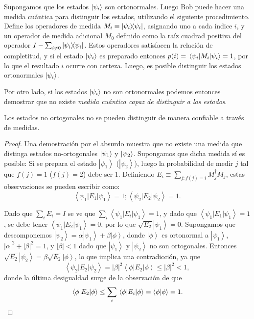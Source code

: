 Supongamos que los estados $\ket{\psi_i}$ son ortonormales. Luego Bob puede hacer una medida cuántica para distinguir los estados, utilizando el siguiente procedimiento. Define
los operadores de medida $M_i \equiv \ketbra{\psi_i}{\psi_i}$, 
asignando uno a cada índice $i$, y un operador de medida adicional $M_0$ definido como la raíz cuadrad positiva del operador $I - \sum_{i \neq 0}
\ketbra{\psi_i}{\psi_i}$. Estos operadores satisfacen la relación de completitud,
y si el estado $\ket{\psi_i}$ es preparado entonces $p(i) = \mel{\psi_i}{M_i}
{\psi_i} = 1$, por lo que el resultado $i$ ocurre con certeza. 
Luego, es posible distinguir los estados ortonormales $\ket{\psi_i}$.

Por otro lado, si los estados $\ket{\psi_i}$ 
no son ortonormales podemos entonces demostrar que no existe  \emph{medida cuántica capaz de distinguir a los estados}.

\begin{theorem}
  Los estados no ortogonales no se pueden distinguir de manera confiable a través de medidas.

\end{theorem}

\begin{proof}
  Una demostración por el absurdo muestra que no existe una medida que distinga estados no-ortogonales $\ket{\psi_1}$ y $\ket{\psi_2}$. Supongamos que dicha medida sí es posible: 
Si se prepara el estado $\left|\psi_1\right\rangle$
($\left|\psi_2\right\rangle$), luego la probabilidad de medir 
  $j$ tal que $f(j) = 1$ ($f(j)
  = 2$) debe ser 1. Definiendo
$E_i \equiv \sum_{j: f(j) = i}M_j^\dagger M_j$, estas observaciones se pueden escribir como:
\begin{equation*}
\left\langle\psi_1 |  E_1 |\psi_1\right\rangle = 1; \left\langle\psi_2 |  E_2 |\psi_2\right\rangle = 1.
\end{equation*}

Dado que $\sum_iE_i = I$ se ve que
$\sum_i\left\langle\psi_1 |  E_i |\psi_1\right\rangle = 1$, y dado que
$\left\langle\psi_1 |  E_1 |\psi_1\right\rangle = 1$, se debe tener
$\left\langle\psi_1 |  E_2 |\psi_1\right\rangle = 0$, por lo que
$\sqrt{E_2}\left|\psi_1\right\rangle = 0$. Supongamos que descomponemos 
$\left|\psi_2\right\rangle = \alpha\left|\psi_1\right\rangle + \beta\left|\phi\right\rangle$,
donde $\left|\phi\right\rangle$ es ortonormal a
$\left|\psi_1\right\rangle$, $|\alpha|^2 + |\beta|^2 = 1$, y
$|\beta| <
  1$ dado que $\left|\psi_1\right\rangle$ y $\left|\psi_2\right\rangle$
no son ortogonales. Entonces
$\sqrt{E_2}\left|\psi_2\right\rangle = \beta\sqrt{E_2}\left|\phi\right\rangle$,
lo que implica una contradicción, ya que
\begin{equation*}\left\langle\psi_2 |  E_2 |\psi_2\right\rangle = |\beta|^2\left\langle\phi |  E_2 |\phi\right\rangle \leq |\beta|^2
    < 1,
    \end{equation*} 
    donde la última desigualdad surge de la observación de que
 \begin{equation*}
    \mel{\phi}{E_2}{\phi} \leq \sum_i\mel{\phi}{E_i}{\phi} =
    \braket{\phi}{\phi} = 1.
  \end{equation*}
\end{proof}

